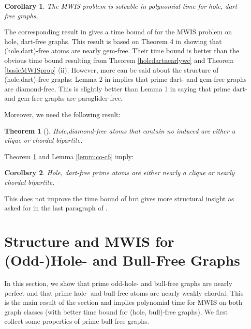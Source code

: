 \documentclass[11pt]{article}
\newcommand{\0}{\text{ has a co-join to }}
\newcommand{\1}{\text{ has a join to }}
\newtheorem{theo}{Theorem}
\newtheorem{coro}{Corollary}
\begin{document}
\begin{coro}
The MWIS problem is solvable in polynomial time for hole, dart-free graphs.
\end{coro}

The corresponding result in \cite{BasChaKar2012} gives a time bound of  for the MWIS problem on hole, dart-free graphs. This result is based on Theorem 4 in \cite{BasChaKar2012} showing that (hole,dart)-free atoms are nearly gem-free. Their time bound is better than the obvious time bound resulting from Theorem \ref{holedartnearlywc} and Theorem \ref{basicMWISprop} (ii). However, more can be said about the structure of (hole,dart)-free graphs: Lemma 2 in \cite{Brand2004} implies that prime dart- and gem-free graphs are diamond-free. This is slightly better than Lemma 1 in \cite{BasChaKar2012} saying that prime dart- and gem-free graphs are paraglider-free.  

Moreover, we need the following result:

\begin{theo}[\cite{BerBraGiaMaf2012}]\label{holediamondcoC6freeatoms}   
Hole,diamond-free atoms that contain no induced  are either a clique or chordal bipartite. 
\end{theo}

Theorem \ref{holediamondcoC6freeatoms} and Lemma \ref{lemm:co-c6} imply: 

\begin{coro}\label{holedartfrstructure}
Hole, dart-free prime atoms are either nearly a clique or nearly chordal bipartite. 
\end{coro}

This does not improve the  time bound of \cite{BasChaKar2012} but gives more structural insight as asked for in the last paragraph of \cite{BasChaKar2012}.  
 
\section{Structure and MWIS for (Odd-)Hole- and Bull-Free Graphs}\label{holebullfr}

In this section, we show that prime odd-hole- and bull-free graphs are nearly perfect and that prime hole- and bull-free atoms are nearly weakly chordal. This is the main result of the section and implies polynomial time for MWIS on both graph classes (with better time bound for (hole, bull)-free graphs). We first collect some properties of prime bull-free graphs. 

\medskip
\end{document}

